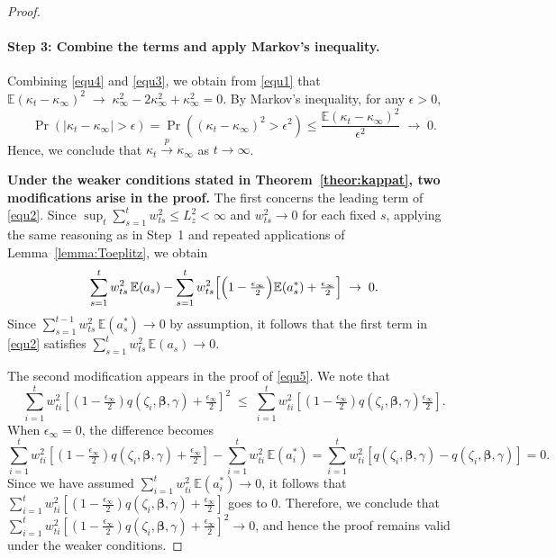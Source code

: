 \documentclass[12pt]{article}
\begin{document}
\begin{proof}
\paragraph{Step 3: Combine the terms and apply Markov's inequality.}
Combining \eqref{equ4} and \eqref{equ3}, we obtain from \eqref{equ1} that
$\mathbb{E}(\kappa_t-\kappa_\infty)^2 \;\to\; 
\kappa_\infty^2 - 2\kappa_\infty^2 + \kappa_\infty^2 = 0$.
By Markov's inequality, for any $\epsilon > 0$,
\[
\Pr(|\kappa_t-\kappa_\infty|>\epsilon) 
= \Pr\!\left((\kappa_t-\kappa_\infty)^2>\epsilon^2\right) 
\le \frac{\mathbb{E}(\kappa_t-\kappa_\infty)^2}{\epsilon^2} \;\to\; 0.
\]
Hence, we conclude that $\kappa_t \stackrel{p}{\rightarrow} \kappa_\infty$ as $t \to \infty$.

\textbf{Under the weaker conditions stated in Theorem~\ref{theor:kappat}, two modifications arise in the proof.}
The first concerns the leading term of \eqref{equ2}. Since
$\sup_t \sum_{s=1}^t w_{ts}^2 \le L_z^2 < \infty$ and $w_{ts}^2 \to 0$ for each fixed $s$,
applying the same reasoning as in Step~1 and repeated applications of Lemma~\ref{lemma:Toeplitz}, we obtain
\[
\sum_{s=1}^t w_{ts}^2 \,\mathbb{E}(a_s) 
- \sum_{s=1}^t w_{ts}^2 \!\left[\Bigl(1-\tfrac{\epsilon_\infty}{2}\Bigr)\mathbb{E}(a_s^\ast) 
+ \tfrac{\epsilon_\infty}{2}\right] \;\to\; 0.
\]
Since $\sum_{s=1}^{t-1} w_{ts}^2 \,\mathbb{E}(a_s^\ast) \to 0$ by assumption, 
it follows that the first term in \eqref{equ2} satisfies
$\sum_{s=1}^{t} w_{ts}^2 \,\mathbb{E}(a_s) \to 0$.

\noindent
The second modification appears in the proof of \eqref{equ5}. We note that
\[
\sum_{i=1}^t w_{ti}^2 
\left[\left(1-\tfrac{\epsilon_\infty}{2}\right) q\!\left(\zeta_i,\bm{\beta},\gamma \right) + \tfrac{\epsilon_\infty}{2} \right]^2 \;\le\; 
\sum_{i=1}^t w_{ti}^2 \left[\left(1-\tfrac{\epsilon_\infty}{2}\right) q\!\left(\zeta_i,\bm{\beta},\gamma \right) \tfrac{\epsilon_\infty}{2} \right].
\]
When $\epsilon_\infty=0$, the difference becomes
\begin{equation*}
\sum_{i=1}^t w_{ti}^2 \left[\left(1-\tfrac{\epsilon_\infty}{2}\right) q\!\left(\zeta_i,\bm{\beta},\gamma \right) 
+ \tfrac{\epsilon_\infty}{2} \right]
- \sum_{i=1}^t w_{ti}^2\,\mathbb{E}(a_i^\ast) =\sum_{i=1}^t w_{ti}^2 
\left[q\!\left(\zeta_i,\bm{\beta},\gamma \right) - q\!\left(\zeta_i,\bm{\beta},\gamma \right)\right] =0.
\end{equation*}
Since we have assumed $\sum_{i=1}^t w_{ti}^2\,\mathbb{E}(a_i^\ast) \to 0$, it follows that $\sum_{i=1}^t w_{ti}^2 \left[\left(1-\tfrac{\epsilon_\infty}{2}\right) q\!\left(\zeta_i,\bm{\beta},\gamma \right) + \tfrac{\epsilon_\infty}{2}\right]$ goes to 0.
Therefore, we conclude that 
$\sum_{i=1}^t w_{ti}^2 \left[\left(1-\tfrac{\epsilon_\infty}{2}\right) q\!\left(\zeta_i,\bm{\beta},\gamma \right) + \tfrac{\epsilon_\infty}{2}\right]^2 \to 0$,
and hence the proof remains valid under the weaker conditions.
\end{proof}
\end{document}
